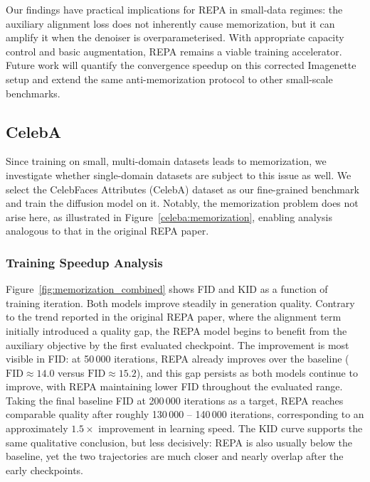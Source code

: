 Our findings have practical implications for REPA in small-data regimes: the
auxiliary alignment loss does not inherently cause memorization, but it can
amplify it when the denoiser is overparameterised. With appropriate capacity
control and basic augmentation, REPA remains a viable training accelerator.
Future work will quantify the convergence speedup on this corrected Imagenette
setup and extend the same anti-memorization protocol to other small-scale
benchmarks.

\subsection{CelebA}
\label{sec:celeba}

Since training on small, multi-domain datasets leads to memorization, we investigate
whether single-domain datasets are subject to this issue as well. We select the
CelebFaces Attributes (CelebA) dataset as our fine-grained benchmark and train the
diffusion model on it. Notably, the memorization problem does not arise here, as
illustrated in Figure~\ref{celeba:memorization}, enabling analysis analogous to that
in the original REPA paper.

\subsubsection{Training Speedup Analysis}

Figure~\ref{fig:memorization_combined} shows FID and KID as a function of training
iteration. Both models improve steadily in generation quality. Contrary to the
trend reported in the original REPA paper, where the alignment term initially
introduced a quality gap, the REPA model begins to benefit from the auxiliary
objective by the first evaluated checkpoint. The improvement is most visible in
FID: at 50\,000 iterations, REPA already improves over the baseline
($\mathrm{FID}\approx 14.0$ versus $\mathrm{FID}\approx 15.2$), and this gap
persists as both models continue to improve, with REPA maintaining lower FID
throughout the evaluated range. Taking the final baseline FID at 200\,000
iterations as a target, REPA reaches comparable quality after roughly
130\,000 -- 140\,000 iterations, corresponding to an approximately $1.5{\times}$
improvement in learning speed. The KID curve supports the same qualitative
conclusion, but less decisively: REPA is also usually below the baseline, yet the
two trajectories are much closer and nearly overlap after the early checkpoints.


